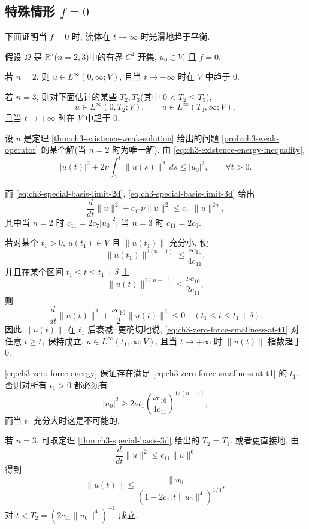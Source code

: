\subsection{特殊情形 $f=0$}
\label{subsec:ch3-zero-force}
下面证明当 $f=0$ 时, 流体在 $t\to\infty$ 时光滑地趋于平衡.

\begin{Theorem}
\label{thm:ch3-zero-force-decay}
假设 $\Omega$ 是 $\mathbb R^n$($n=2,3$)中的有界 $C^2$ 开集, $u_0\in V$, 且 $f=0$.

若 $n=2$, 则 $u\in L^\infty(0,\infty;V)$, 且当 $t\to+\infty$ 时在 $V$ 中趋于 $0$.

若 $n=3$, 则对下面估计的某些 $T_2,T_3$(其中 $0<T_2\leq T_3$),
\[
u\in L^\infty(0,T_2;V),
\qquad u\in L^\infty(T_3,\infty;V),
\]
且当 $t\to+\infty$ 时在 $V$ 中趋于 $0$.
\end{Theorem}

\begin{Proof}
设 $u$ 是定理 \ref{thm:ch3-existence-weak-solution} 给出的问题 \ref{prob:ch3-weak-operator} 的某个解(当 $n=2$ 时为唯一解). 由 \eqref{eq:ch3-existence-energy-inequality},
\begin{equation}
|u(t)|^2+2\nu\int_0^t\lVert u(s)\rVert^2\,ds
\leq|u_0|^2,
\qquad\forall t>0.
\label{eq:ch3-zero-force-energy}
\end{equation}

\hypertarget{chapter-03-page-231}{}
而 \eqref{eq:ch3-special-basis-limit-2d}, \eqref{eq:ch3-special-basis-limit-3d} 给出
\begin{equation}
\frac d{dt}\lVert u\rVert^2+c_{10}\nu\lVert u\rVert^2
\leq c_{11}\lVert u\rVert^{2n},
\label{eq:ch3-zero-force-v-ode}
\end{equation}
其中当 $n=2$ 时 $c_{11}=2c_7|u_0|^2$, 当 $n=3$ 时 $c_{11}=2c_9$.

若对某个 $t_1>0$, $u(t_1)\in V$ 且 $\lVert u(t_1)\rVert$ 充分小, 使
\begin{equation}
\lVert u(t_1)\rVert^{2(n-1)}\leq\frac{\nu c_{10}}{4c_{11}},
\label{eq:ch3-zero-force-smallness-at-t1}
\end{equation}
并且在某个区间 $t_1\leq t\leq t_1+\delta$ 上
\[
\lVert u(t)\rVert^{2(n-1)}\leq\frac{\nu c_{10}}{2c_{11}},
\]
则
\[
\frac d{dt}\lVert u(t)\rVert^2+\frac{\nu c_{10}}2\lVert u(t)\rVert^2\leq0
\quad(t_1\leq t\leq t_1+\delta).
\]
因此 $\lVert u(t)\rVert$ 在 $t_1$ 后衰减; 更确切地说, \eqref{eq:ch3-zero-force-smallness-at-t1} 对任意 $t\geq t_1$ 保持成立, $u\in L^\infty(t_1,\infty;V)$, 且当 $t\to+\infty$ 时 $\lVert u(t)\rVert$ 指数趋于 $0$.

\eqref{eq:ch3-zero-force-energy} 保证存在满足 \eqref{eq:ch3-zero-force-smallness-at-t1} 的 $t_1$. 否则对所有 $t_1>0$ 都必须有
\[
|u_0|^2\geq2\nu t_1
\left(\frac{\nu c_{10}}{4c_{11}}\right)^{1/(n-1)},
\]
而当 $t_1$ 充分大时这是不可能的.

若 $n=3$, 可取定理 \ref{thm:ch3-special-basis-3d} 给出的 $T_2=T_1$. 或者更直接地, 由
\[
\frac d{dt}\lVert u\rVert^2\leq c_{11}\lVert u\rVert^6
\]
得到
\[
\lVert u(t)\rVert\leq
\frac{\lVert u_0\rVert}{(1-2c_{11}t\lVert u_0\rVert^4)^{1/4}},
\]
对 $t<T_2=(2c_{11}\lVert u_0\rVert^4)^{-1}$ 成立.
\end{Proof}
